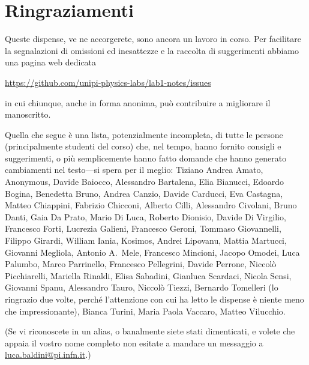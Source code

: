 \chapter*{Ringraziamenti}

Queste dispense, ve ne accorgerete, sono ancora un lavoro in corso.
Per facilitare la segnalazioni di omissioni ed inesattezze e la raccolta di
suggerimenti abbiamo una pagina web dedicata
\begin{center}
  \url{https://github.com/unipi-physics-labs/lab1-notes/issues}
\end{center}
in cui chiunque, anche in forma anonima, può contribuire a migliorare il
manoscritto.

Quella che segue è una lista, potenzialmente incompleta, di tutte le persone
(principalmente studenti del corso) che, nel tempo, hanno fornito consigli e
suggerimenti, o più semplicemente hanno fatto domande che hanno generato
cambiamenti nel testo---si spera per il meglio:
Tiziano Andrea Amato,
Anonymous,
Davide Baiocco,
Alessandro Bartalena,
Elia Bianucci,
Edoardo Bogina,
Benedetta Bruno,
Andrea Canzio,
Davide Carducci,
Eva Castagna,
Matteo Chiappini,
Fabrizio Chicconi,
Alberto Cilli,
Alessandro Civolani,
Bruno Danti,
Gaia Da Prato,
Mario Di Luca,
Roberto Dionisio,
Davide Di Virgilio,
Francesco Forti,
Lucrezia Galieni,
Francesco Geroni,
Tommaso Giovannelli,
Filippo Girardi,
William Iania,
Kosimos,
Andrei Lipovanu,
Mattia Martucci,
Giovanni Megliola,
Antonio A.~Mele,
Francesco Mincioni,
Jacopo Omodei,
Luca Palumbo,
Marco Parrinello,
Francesco Pellegrini,
Davide Perrone,
Niccolò Picchiarelli,
Mariella Rinaldi,
Elisa Sabadini,
Gianluca Scardaci,
Nicola Sensi,
Giovanni Spanu,
Alessandro Tauro,
Niccolò Tiezzi,
Bernardo Tomelleri (lo ringrazio due volte, perché l'attenzione con cui ha
letto le dispense è niente meno che impressionante),
Bianca Turini,
Maria Paola Vaccaro,
Matteo Vilucchio.

\bigskip

(Se vi riconoscete in un alias, o banalmente siete stati dimenticati, e volete
che appaia il vostro nome completo non esitate a mandare un messaggio a
\href{mailto:luca.baldini@pi.infn.it}{luca.baldini@pi.infn.it}.)
